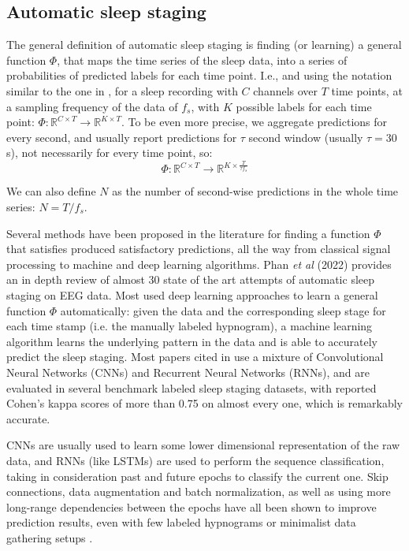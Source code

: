 \subsection{Automatic sleep staging}
\label{section:automatic_sleep_staging}
The general definition of automatic sleep staging is finding (or learning) a general function $\Phi$, that maps the time series of the sleep data, into a series of probabilities of predicted labels for each time point. I.e., and using the notation similar to the one in \cite{Alexander2020}, for a sleep recording with $C$ channels over $T$ time points, at a sampling frequency of the data of $f_s$, with $K$ possible labels for each time point: $\Phi:\mathbb{R}^{C \times T} \rightarrow \mathbb{R}^{K \times T}$. To be even more precise, we aggregate predictions for every second, and usually report predictions for $\tau$ second window (usually $\tau=30$s), not necessarily for every time point, so:
\begin{equation}
    \Phi:\mathbb{R}^{C \times T} \rightarrow \mathbb{R}^{K \times \frac{T}{\tau f_s}}
    \label{eq:automatic_sleep_staging_PHI_definition}
\end{equation}

We can also define $N$ as the number of second-wise predictions in the whole time series: $N = T / f_s$.

Several methods have been proposed in the literature for finding a function $\Phi$ that satisfies produced satisfactory predictions, all the way from classical signal processing to machine and deep learning algorithms. 
Phan \textit{et al} (2022) \cite{2022automaticEEG} provides an in depth review of almost 30 state of the art attempts of automatic sleep staging on EEG data. Most used deep learning approaches to learn a general function $\Phi$ automatically: given the data and the corresponding sleep stage for each time stamp (i.e. the manually labeled hypnogram), a machine learning algorithm learns the underlying pattern in the data and is able to accurately predict the sleep staging. Most papers cited in \cite{2022automaticEEG} use a mixture of Convolutional Neural Networks (CNNs) and Recurrent Neural Networks (RNNs), and are evaluated in several benchmark labeled sleep staging datasets, with reported Cohen's kappa scores of more than 0.75 on almost every one, which is remarkably accurate.

CNNs are usually used to learn some lower dimensional representation of the raw data, and RNNs (like LSTMs) are used to perform the sequence classification, taking in consideration past and future epochs to classify the current one. Skip connections, data augmentation and batch normalization, as well as using more long-range dependencies between the epochs have all been shown to improve prediction results, even with few labeled hypnograms or minimalist data gathering setups \cite{Alexander2020,2022automaticEEG,2020tinysleepnet}.


